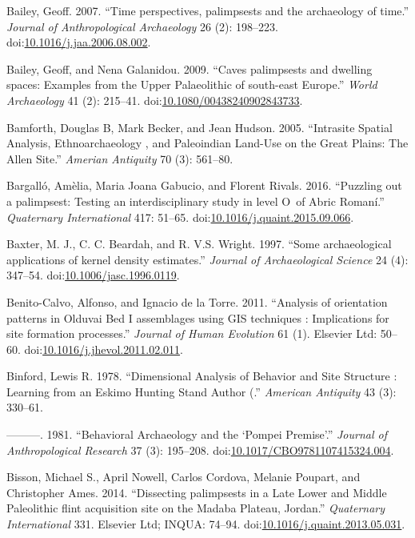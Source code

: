 \documentclass[smallextended]{svjour3}       %
\begin{document}
\hypertarget{ref-Bailey2007}{}
Bailey, Geoff. 2007. ``Time perspectives, palimpsests and the
archaeology of time.'' \emph{Journal of Anthropological Archaeology} 26
(2): 198--223.
doi:\href{https://doi.org/10.1016/j.jaa.2006.08.002}{10.1016/j.jaa.2006.08.002}.

\hypertarget{ref-Bailey2009}{}
Bailey, Geoff, and Nena Galanidou. 2009. ``Caves palimpsests and
dwelling spaces: Examples from the Upper Palaeolithic of south-east
Europe.'' \emph{World Archaeology} 41 (2): 215--41.
doi:\href{https://doi.org/10.1080/00438240902843733}{10.1080/00438240902843733}.

\hypertarget{ref-Bamforth2005}{}
Bamforth, Douglas B, Mark Becker, and Jean Hudson. 2005. ``Intrasite
Spatial Analysis, Ethnoarchaeology , and Paleoindian Land-Use on the
Great Plains: The Allen Site.'' \emph{Amerian Antiquity} 70 (3):
561--80.

\hypertarget{ref-Bargallo2016}{}
Bargalló, Amèlia, Maria Joana Gabucio, and Florent Rivals. 2016.
``Puzzling out a palimpsest: Testing an interdisciplinary study in level
O~of Abric Romaní.'' \emph{Quaternary International} 417: 51--65.
doi:\href{https://doi.org/10.1016/j.quaint.2015.09.066}{10.1016/j.quaint.2015.09.066}.

\hypertarget{ref-Baxter1997}{}
Baxter, M. J., C. C. Beardah, and R. V.S. Wright. 1997. ``Some
archaeological applications of kernel density estimates.'' \emph{Journal
of Archaeological Science} 24 (4): 347--54.
doi:\href{https://doi.org/10.1006/jasc.1996.0119}{10.1006/jasc.1996.0119}.

\hypertarget{ref-Benito-calvo2011}{}
Benito-Calvo, Alfonso, and Ignacio de la Torre. 2011. ``Analysis of
orientation patterns in Olduvai Bed I assemblages using GIS techniques :
Implications for site formation processes.'' \emph{Journal of Human
Evolution} 61 (1). Elsevier Ltd: 50--60.
doi:\href{https://doi.org/10.1016/j.jhevol.2011.02.011}{10.1016/j.jhevol.2011.02.011}.

\hypertarget{ref-Binford1978}{}
Binford, Lewis R. 1978. ``Dimensional Analysis of Behavior and Site
Structure : Learning from an Eskimo Hunting Stand Author (.''
\emph{American Antiquity} 43 (3): 330--61.

\hypertarget{ref-Binford1981a}{}
---------. 1981. ``Behavioral Archaeology and the `Pompei Premise'.''
\emph{Journal of Anthropological Research} 37 (3): 195--208.
doi:\href{https://doi.org/10.1017/CBO9781107415324.004}{10.1017/CBO9781107415324.004}.

\hypertarget{ref-Bisson2014}{}
Bisson, Michael S., April Nowell, Carlos Cordova, Melanie Poupart, and
Christopher Ames. 2014. ``Dissecting palimpsests in a Late Lower and
Middle Paleolithic flint acquisition site on the Madaba Plateau,
Jordan.'' \emph{Quaternary International} 331. Elsevier Ltd; INQUA:
74--94.
doi:\href{https://doi.org/10.1016/j.quaint.2013.05.031}{10.1016/j.quaint.2013.05.031}.
\end{document}
